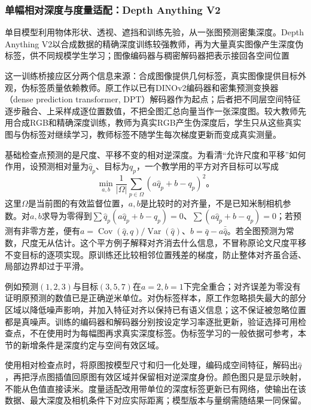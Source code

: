 \subsubsection{单幅相对深度与度量适配：Depth Anything V2}
\label{sec:vision-recognition-depth-anything}

单目模型利用物体形状、透视、遮挡和训练先验，从一张图预测密集深度。Depth Anything V2以合成数据的精确深度训练较强教师，再为大量真实图像产生深度伪标签，供不同规模学生学习；图像编码器与稠密解码器把表示接回各空间位置

这一训练桥接应区分两个信息来源：合成图像提供几何标签，真实图像提供目标外观，伪标签质量依赖教师。原工作以已有DINOv2编码器和密集预测变换器（dense prediction transformer, DPT）解码器作为起点；后者把不同层空间特征逐步融合、上采样成逐位置数值，不把全图汇总向量当作一张深度图。较大教师先用合成RGB和精确深度训练，教师为真实RGB产生伪深度后，学生只从这些真实图与伪标签对继续学习，教师标签不随学生每次梯度更新而变成真实测量。

基础检查点预测的是尺度、平移不变的相对逆深度。为看清“允许尺度和平移”如何作用，设预测相对量为$\hat q_p$、目标为$q_p$，一个教学用的平方对齐目标可以写成
\begin{equation}
 \min_{a,b}\frac1{|\Omega|}
       \sum_{p\in\Omega}(a\hat q_p+b-q_p)^2\text{。}
 \label{eq:vision-relative-depth-alignment}
\end{equation}
这里$\Omega$是当前图的有效监督位置，$a,b$是比较时的对齐量，不是已知米制相机参数。对$a,b$求导为零得到$\sum\hat q_p(a\hat q_p+b-q_p)=0$、$\sum(a\hat q_p+b-q_p)=0$；若预测有非零方差，便有$a=\operatorname{Cov}(\hat q,q)/\operatorname{Var}(\hat q)$、$b=\bar q-a\bar{\hat q}$。若全图预测为常数，尺度无从估计。这个平方例子解释对齐消去什么信息，不冒称原论文尺度平移不变目标的逐项实现。原训练还比较相邻位置残差的梯度，防止整体对齐虽合适、局部边界却过于平滑。

例如预测$(1,2,3)$与目标$(3,5,7)$在$a=2,b=1$下完全重合；对齐误差为零没有证明原预测的数值已是正确逆米单位。对伪标签样本，原工作忽略损失最大的部分区域以降低噪声影响，并加入特征对齐以保持已有语义信息；这不保证被忽略位置都是真噪声。训练的编码器和解码器分别按设定学习率逐批更新，验证选择可用检查点，不在使用时为每幅图再求真实深度标签。伪标签学习的一般依据可参考，本节的新增条件是深度约定与空间有效区域。

使用相对检查点时，将原图按模型尺寸和归一化处理，编码成空间特征，解码出$\hat q$，再把浮点图插值回原图有效区域并保留相对逆深度身份。颜色图只是显示映射，不能从色值直接读米。度量适配改用带单位的深度标签更新已有网络，使输出在该数据、最大深度及相机条件下对应实际距离；模型版本与量纲需随结果一同保留。

